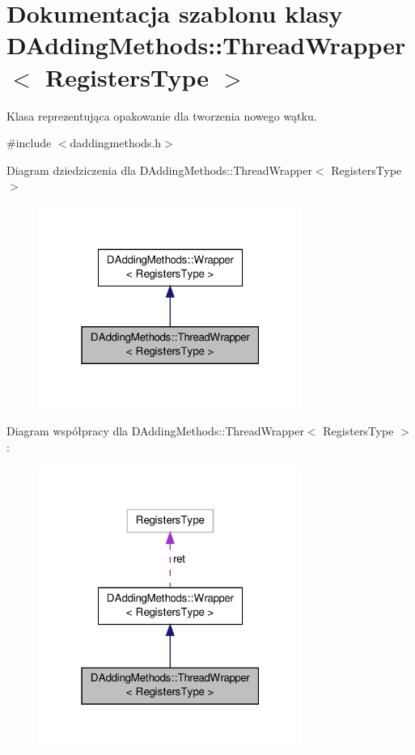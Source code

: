 \hypertarget{class_d_adding_methods_1_1_thread_wrapper}{\section{Dokumentacja szablonu klasy D\-Adding\-Methods\-:\-:Thread\-Wrapper$<$ Registers\-Type $>$}
\label{class_d_adding_methods_1_1_thread_wrapper}
}


Klasa reprezentująca opakowanie dla tworzenia nowego wątku.  




{\ttfamily \#include $<$daddingmethods.\-h$>$}



Diagram dziedziczenia dla D\-Adding\-Methods\-:\-:Thread\-Wrapper$<$ Registers\-Type $>$\nopagebreak
\begin{figure}[H]
\begin{center}
\leavevmode
\includegraphics[width=244pt]{class_d_adding_methods_1_1_thread_wrapper__inherit__graph}
\end{center}
\end{figure}


Diagram współpracy dla D\-Adding\-Methods\-:\-:Thread\-Wrapper$<$ Registers\-Type $>$\-:\nopagebreak
\begin{figure}[H]
\begin{center}
\leavevmode
\includegraphics[width=244pt]{class_d_adding_methods_1_1_thread_wrapper__coll__graph}
\end{center}
\end{figure}
